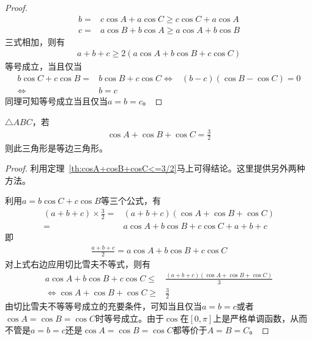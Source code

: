 \begin{proof}
\begin{align*}
    b ={}& c\cos A + a\cos C \ge c\cos C + a\cos A\\
    c ={}& a\cos B + b\cos A \ge a\cos A + b\cos B
  \end{align*}
  三式相加，则有
  \begin{align*}
    a + b + c \ge 2(a\cos A + b\cos B + c\cos C)
  \end{align*}
  等号成立，当且仅当
  \begin{align*}
    b\cos C + c \cos B ={}& b\cos B + c\cos C \iff& (b-c)(\cos B-\cos C)=0\\
    \iff& b=c
  \end{align*}
  同理可知等号成立当且仅当$a=b=c$。
\end{proof}


\begin{example}
  $\triangle ABC$，若
  \begin{align*}
    \cos A + \cos B + \cos C = \frac32
  \end{align*}
  则此三角形是等边三角形。
\end{example}
\begin{proof}利用定理~\ref{th:cosA+cosB+cosC<=3/2}马上可得结论。这里提供另外两种方法。

  利用$a=b\cos C + c\cos B$等三个公式，有
  \begin{align*}
    (a+b+c) \times \frac32 ={}& (a+b+c)(\cos A + \cos B + \cos C)\\
                           ={}& a\cos A + b\cos B + c\cos C + a + b + c
  \end{align*}
  即
  \begin{align*}
    \frac{a+b+c}2 = a\cos A + b\cos B + c\cos C
  \end{align*}
  对上式右边应用切比雪夫不等式，则有
  \begin{align*}
      a\cos A + b\cos B + c\cos C \le{}& \frac{(a+b+c)(\cos A + \cos B + \cos C)}{3} \\
    \iff \cos A + \cos B + \cos C \ge{}& \frac32
  \end{align*}
  由切比雪夫不等等号成立的充要条件，可知当且仅当$a=b=c$或者$\cos A = \cos B = \cos C$时等号成立。由于$\cos$在$[0,\pi]$上是严格单调函数，从而不管是$a=b=c$还是$\cos A=\cos B=\cos C$都等价于$A=B=C$。
\end{proof}

